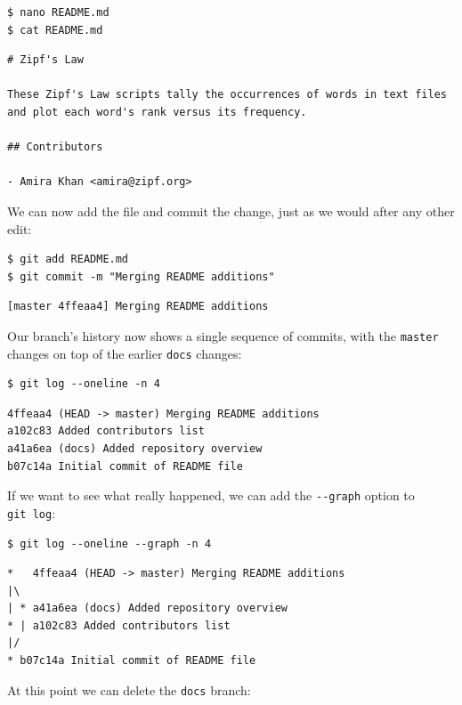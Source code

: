 \documentclass[
]{krantz}
\begin{document}
\begin{verbatim}
$ nano README.md
$ cat README.md
\end{verbatim}

\begin{verbatim}
# Zipf's Law

These Zipf's Law scripts tally the occurrences of words in text files
and plot each word's rank versus its frequency.

## Contributors

- Amira Khan <amira@zipf.org>
\end{verbatim}

We can now add the file and commit the change,
just as we would after any other edit:

\begin{verbatim}
$ git add README.md
$ git commit -m "Merging README additions"
\end{verbatim}

\begin{verbatim}
[master 4ffeaa4] Merging README additions
\end{verbatim}

Our branch's history now shows a single sequence of commits,
with the \texttt{master} changes on top of the earlier \texttt{docs} changes:

\begin{verbatim}
$ git log --oneline -n 4
\end{verbatim}

\begin{verbatim}
4ffeaa4 (HEAD -> master) Merging README additions
a102c83 Added contributors list
a41a6ea (docs) Added repository overview
b07c14a Initial commit of README file
\end{verbatim}

If we want to see what really happened,
we can add the \texttt{-\/-graph} option to \texttt{git\ log}:

\begin{verbatim}
$ git log --oneline --graph -n 4
\end{verbatim}

\begin{verbatim}
*   4ffeaa4 (HEAD -> master) Merging README additions
|\  
| * a41a6ea (docs) Added repository overview
* | a102c83 Added contributors list
|/  
* b07c14a Initial commit of README file
\end{verbatim}

At this point we can delete the \texttt{docs} branch:
\end{document}
